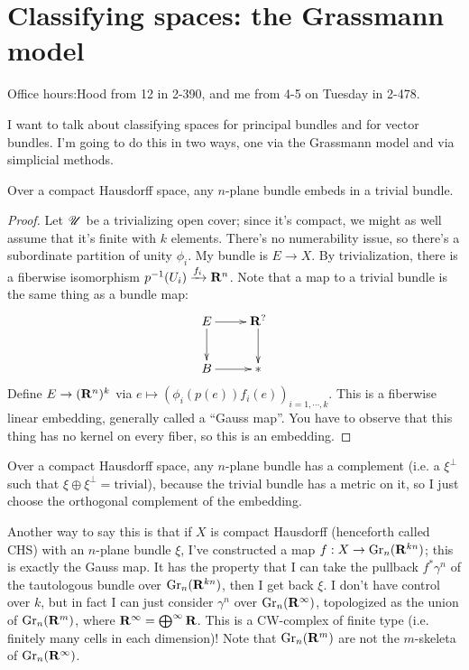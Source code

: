 \section{Classifying spaces: the Grassmann model}
Office hours:Hood from 12 in 2-390, and me from 4-5 on Tuesday in 2-478.

I want to talk about classifying spaces for principal bundles and for vector bundles. I'm going to do this in two ways, one via the Grassmann model and via simplicial methods.
\begin{lemma}
    Over a compact Hausdorff space, any $n$-plane bundle embeds in a trivial bundle.
\end{lemma}
\begin{proof}
    Let $\mathscr U$ be a trivializing open cover; since it's compact, we might as well assume that it's finite with $k$ elements.
    There's no numerability issue, so there's a subordinate partition of unity $\phi_i$.
    My bundle is $E\to X$. By trivialization, there is a fiberwise isomorphism $p^{-1}(U_i)\xrightarrow{f_i}\mathbf R^n$.
    Note that a map to a trivial bundle is the same thing as a bundle map:
    \begin{equation*}
	\xymatrix{
	    E\ar[r]\ar[d] & \RR^?\ar[d]\\
	    B\ar[r] & \ast
	    }
    \end{equation*}
    Define $E\to (\mathbf R^n)^k$ via $e\mapsto (\phi_i(p(e))f_i(e))_{i=1,\cdots,k}$. This is a fiberwise linear embedding, generally called a ``Gauss map''.
    You have to observe that this thing has no kernel on every fiber, so this is an embedding.
\end{proof}
\begin{corollary}
    Over a compact Hausdorff space, any $n$-plane bundle has a complement (i.e. a $\xi^\perp$ such that $\xi\oplus\xi^\perp = \mathrm{trivial}$), because the trivial bundle has a metric on it, so I just choose the orthogonal complement of the embedding.
\end{corollary}
Another way to say this is that if $X$ is compact Hausdorff (henceforth called CHS) with an $n$-plane bundle $\xi$, I've constructed a map $f:X\to\mathrm{Gr}_n(\mathbf R^{kn})$; this is exactly the Gauss map.
It has the property that I can take the pullback $f^\ast\gamma^n$ of the tautologous bundle over $\mathrm{Gr}_n(\mathbf R^{kn})$, then I get back $\xi$.
I don't have control over $k$, but in fact I can just consider $\gamma^n$ over $\mathrm{Gr}_n(\mathbf R^\infty)$, topologized as the union of $\mathrm{Gr}_n(\mathbf R^m)$, where $\mathbf R^\infty = \bigoplus^\infty\mathbf R$. This is a CW-complex of finite type (i.e. finitely many cells in each dimension)! Note that $\mathrm{Gr}_n(\mathbf R^m)$ are not the $m$-skeleta of $\mathrm{Gr}_n(\mathbf R^\infty)$.
